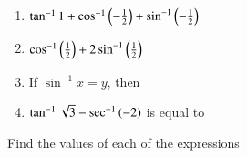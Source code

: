 \begin{enumerate}[label=\thesubsection.\arabic*,ref=\thesubsection.\theenumi,resume*,itemsep=1ex]
	\item $\tan^{-1}1+\cos^{-1}\left(-\frac{1}{2}\right)+\sin^{-1}\left(-\frac{1}{2}\right)$
	\item $\cos^{-1}\left(\frac{1}{2}\right)+2\sin^{-1}\left(\frac{1}{2}\right)$
	\item If $\sin^{-1}x = y$, then
\begin{enumerate}
\end{enumerate}
	\item $\tan^{-1}\sqrt{3}-\sec^{-1}\left(-{2}\right)$ is equal to
\begin{enumerate}
\end{enumerate}
\end{enumerate}
Find the values of each of the expressions
